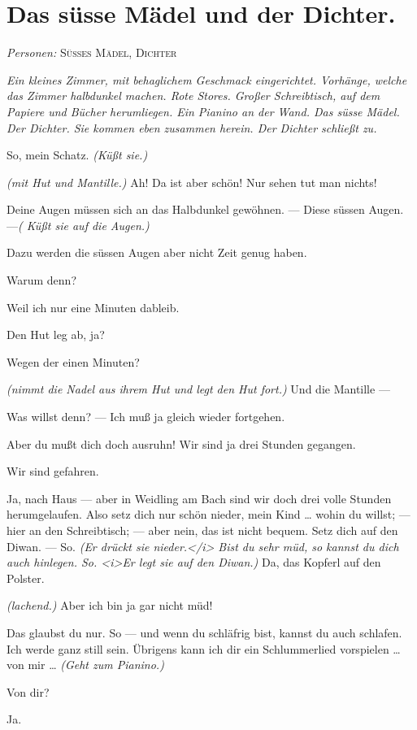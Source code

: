 \documentclass[
	final,
	a4paper,
	ngerman,
	mpinclude = true, %
	twoside = true,
	open = right,
	cleardoublepage = plain,
	DIV = 13,
	BCOR = 1cm,
	titlepage = firstiscover,
	]{scrbook}
\newcommand{\scene}{\section}
\newcommand{\direction}[1]{\textit{(#1)}}
\newcommand{\setting}[1]{\vspace{-0.5\baselineskip}\centering\textit{#1}}
\newcommand{\characterlist}[1]{{\begin{center}\textit{Personen:} #1\end{center}}}
\newcommand{\thecharacter}[1]{\textup{\textsc{#1}}}
\newcommand{\thesuesse}{\thecharacter{Süßes Mädel}}
\newcommand{\thedichter}{\thecharacter{Dichter}}
\newcommand{\character}[1]{\item[#1:]}
\newcommand{\suesse}{\character{\thesuesse}}
\newcommand{\dichter}{\character{\thedichter}}
\begin{document}
\scene{Das süsse Mädel und der Dichter.}
\characterlist{\thesuesse, \thedichter}
\setting{Ein kleines Zimmer, mit behaglichem Geschmack eingerichtet. Vorhänge, welche das Zimmer halbdunkel machen. Rote Stores. Großer Schreibtisch, auf dem Papiere und Bücher herumliegen. Ein Pianino an der Wand. Das süsse Mädel. Der Dichter. Sie kommen eben zusammen herein. Der Dichter schließt zu.}
\begin{play}
	\dichter
	So, mein Schatz. \direction{Küßt sie.}

	\suesse
	\direction{mit Hut und Mantille.} Ah! Da ist aber schön! Nur sehen tut man nichts!

	\dichter
	Deine Augen müssen sich an das Halbdunkel gewöhnen. --- Diese süssen Augen. ---\direction{ Küßt sie auf die Augen.}

	\suesse
	Dazu werden die süssen Augen aber nicht Zeit genug haben.

	\dichter
	Warum denn?

	\suesse
	Weil ich nur eine Minuten dableib.

	\dichter
	Den Hut leg ab, ja?

	\suesse
	Wegen der einen Minuten?

	\dichter
	\direction{nimmt die Nadel aus ihrem Hut und legt den Hut fort.} Und die Mantille ---

	\suesse
	Was willst denn? --- Ich muß ja gleich wieder fortgehen.

	\dichter
	Aber du mußt dich doch ausruhn! Wir sind ja drei Stunden gegangen.

	\suesse
	Wir sind gefahren.

	\dichter
	Ja, nach Haus --- aber in Weidling am Bach sind wir doch drei volle Stunden herumgelaufen. Also setz dich nur schön nieder, mein Kind \ldots{} wohin du willst; --- hier an den Schreibtisch; --- aber nein, das ist nicht bequem. Setz dich auf den Diwan. --- So. \direction{Er drückt sie nieder.</i> Bist du sehr müd, so kannst du dich auch hinlegen. So. <i>Er legt sie auf den Diwan.} Da, das Kopferl auf den Polster.

	\suesse
	\direction{lachend.} Aber ich bin ja gar nicht müd!

	\dichter
	Das glaubst du nur. So --- und wenn du schläfrig bist, kannst du auch schlafen. Ich werde ganz still sein. Übrigens kann ich dir ein Schlummerlied vorspielen \ldots{} von mir \ldots{} \direction{Geht zum Pianino.}

	\suesse
	Von dir?

	\dichter
	Ja.


\end{play}
\end{document}

